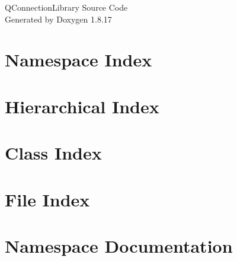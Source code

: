 \let\mypdfximage\pdfximage\def\pdfximage{\immediate\mypdfximage}\documentclass[twoside]{book}
\newcommand{\+}{\discretionary{\mbox{\scriptsize$\hookleftarrow$}}{}{}}
\newcommand{\clearemptydoublepage}{%
  \newpage{\pagestyle{empty}\cleardoublepage}%
}
\begin{document}
\hypersetup{pageanchor=false,
             bookmarksnumbered=true,
             pdfencoding=unicode
            }
\begin{titlepage}
\vspace*{7cm}
\begin{center}%
{\Large Q\+Connection\+Library Source Code }\\
\vspace*{1cm}
{\large Generated by Doxygen 1.8.17}\\
\end{center}
\end{titlepage}
\clearemptydoublepage
{}
\tableofcontents
\clearemptydoublepage
{}
\hypersetup{pageanchor=true}

\chapter{Namespace Index}

\chapter{Hierarchical Index}

\chapter{Class Index}

\chapter{File Index}

\chapter{Namespace Documentation}














\end{document}
